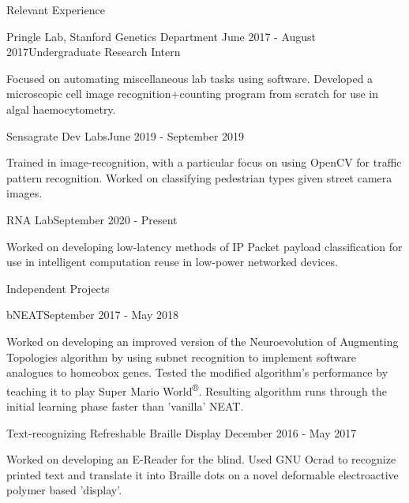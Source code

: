 \documentclass{resume} %
\begin{document}
\begin{resumeSection}{Relevant Experience}

\begin{resumeSubsection}{Pringle Lab, Stanford Genetics Department}
	{June 2017 - August 2017}{Undergraduate Research Intern}{}
\item Focused on automating miscellaneous lab tasks using software. Developed a 
	microscopic cell image recognition+counting program from scratch for
	use in algal haemocytometry. 
\end{resumeSubsection}
\begin{resumeSubsection}{Sensagrate Dev Labs}{June 2019 - September 2019}{}{}
\item Trained in image-recognition, with a particular focus on using OpenCV for
	traffic pattern recognition. Worked on classifying pedestrian types
	given street camera images. 
\end{resumeSubsection}
\begin{resumeSubsection}{RNA Lab}{September 2020 - Present}{}{}
\item Worked on developing low-latency methods of IP Packet payload
	classification for use in intelligent computation reuse in low-power
	networked devices. 
\end{resumeSubsection}

\end{resumeSection}


\begin{resumeSection}{Independent Projects} \itemsep -2pt

\begin{resumeSubsection}{bNEAT}{September 2017 - May 2018}{}{}
\item Worked on developing an improved version of the Neuroevolution of
	Augmenting Topologies algorithm by using subnet recognition to
	implement software analogues to homeobox genes. Tested the modified
	algorithm's performance by teaching it to play Super Mario
	World\textsuperscript{®}. Resulting algorithm runs through the initial
	learning phase faster than 'vanilla' NEAT.
\end{resumeSubsection}
\begin{resumeSubsection}{Text-recognizing Refreshable Braille Display}
	{December 2016 - May 2017}{}{}
\item Worked on developing an E-Reader for the blind. Used GNU Ocrad to
	recognize printed text and translate it into Braille dots on a
	novel deformable electroactive polymer based 'display'. 
\end{resumeSubsection}

\end{resumeSection}
\end{document}
